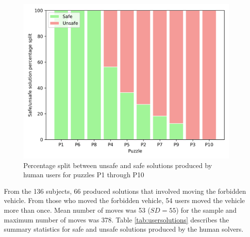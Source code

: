\documentclass[doctor]{thesis} %
\theoremstyle{plain}
\begin{document}
\begin{figure}[htb]
  \centering
\includegraphics[width=0.5\columnwidth]{img/p2.png}
  \caption{Percentage split between unsafe and safe solutions produced by human users for puzzles P1 through P10}
  \label{fig:split}
\end{figure}


From the 136 subjects, 66 produced solutions that involved moving the forbidden vehicle. From those who moved the forbidden vehicle, 54 users moved the vehicle more than once. Mean number of moves was 53 ($SD=55$) for the sample and maximum number of moves was 378. Table \ref{tab:usersolutions} describes the summary statistics for safe and unsafe solutions produced by the human solvers. 
\end{document}
